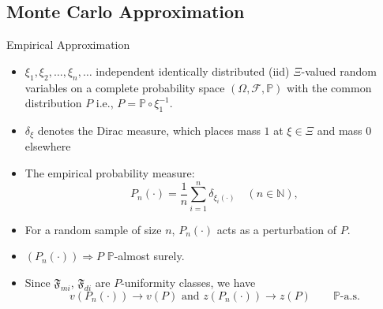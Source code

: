 \documentclass[aspectratio=169,xcolor=dvipsnames,10pt]{beamer}
\newcommand{\fF}{\mathfrak{F}}
\newcommand{\bP}{\mathbb{P}}
\begin{document}
\subsection{Monte Carlo Approximation}
\begin{frame}{Empirical Approximation}
\begin{exampleblock}{}
    \begin{itemize}
        \item $\xi_1,\xi_2,\ldots,\xi_n,\ldots$ independent 
identically distributed (iid) $\Xi$-valued random 
variables on a complete probability space 
$(\Omega,\mathcal{F},\bP)$ with the common distribution $P$ i.e., $P=\bP\circ \xi_1^{-1}$. 
        \item $\delta_{\xi}$ denotes the Dirac measure, which
places mass $1$ at $\xi\in\Xi$ and mass $0$ elsewhere
        \item The empirical probability measure:
\begin{equation}\label{empmeas}
P_n(\cdot)=\frac{1}{n}\sum_{i=1}^n\delta_{\xi_i(\cdot)}
\quad(n\in\mathbb N),
\end{equation}
\item For a random sample of size $n$, $P_n(\cdot)$ acts as a \alert{perturbation of $P$}.
    \end{itemize}
\end{exampleblock}
\pause
\begin{exampleblock}{}
\begin{itemize}
    \item $(P_{n}(\cdot)) \Rightarrow P$ $\mathbb P$-almost surely.
    \item Since $\fF_{mi}$, $\fF_{di}$ are $P$-uniformity classes, we have
    \[
    v(P_{n}(\cdot)) \to v(P) \text{ and } z(P_{n}(\cdot)) \to z(P) \qquad \bP\text{-a.s.}
    \]
\end{itemize}
\end{exampleblock}
\end{frame}
\end{document}
